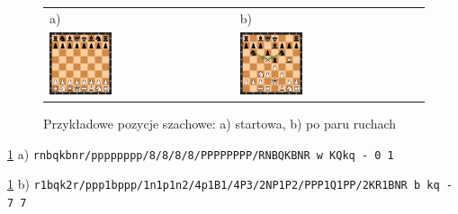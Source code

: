 \begin{figure}[ht]
    \centering
    \begin{tabular}{@{}ll@{}}
        a) & b) \\
        \includegraphics[width=0.35\textwidth]{rozdzialy/rozdzial01/1_komunikacja-z-systemem/rysunki/pozycja_startowa}
        &
        \includegraphics[width=0.35\textwidth]{rozdzialy/rozdzial01/1_komunikacja-z-systemem/rysunki/pozycja_niejasna}
    \end{tabular}
    \caption{Przykładowe pozycje szachowe: a) startowa, b) po paru ruchach}
    \label{fig: basic_chess_positions}
\end{figure}

\centerline{
    \ref{fig: basic_chess_positions} a) \lstset{basicstyle=\ttfamily}\lstinline{rnbqkbnr/pppppppp/8/8/8/8/PPPPPPPP/RNBQKBNR w KQkq - 0 1}
}
\centerline{
    \ref{fig: basic_chess_positions} b) \lstset{basicstyle=\ttfamily}\lstinline{r1bqk2r/ppp1bppp/1n1p1n2/4p1B1/4P3/2NP1P2/PPP1Q1PP/2KR1BNR b kq - 7 7}
}

